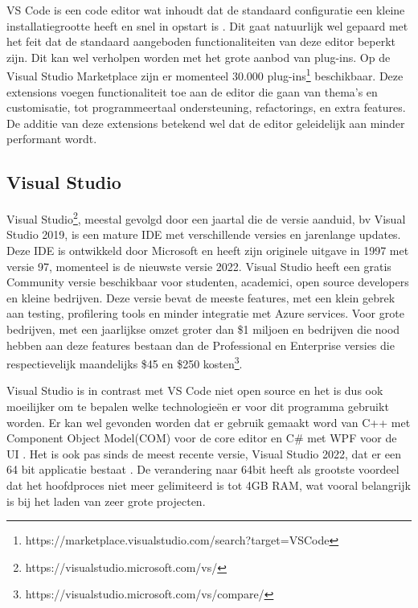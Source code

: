 VS Code is een code editor wat inhoudt dat de standaard configuratie een kleine installatiegrootte heeft en snel in opstart is \autocite{Johnson2019}. Dit gaat natuurlijk wel gepaard met het feit dat de standaard aangeboden functionaliteiten van deze editor beperkt zijn. Dit kan wel verholpen worden met het grote aanbod van plug-ins. Op de Visual Studio Marketplace zijn er momenteel 30.000 plug-ins\footnote{https://marketplace.visualstudio.com/search?target=VSCode} beschikbaar. Deze extensions voegen functionaliteit toe aan de editor die gaan van thema's en customisatie, tot programmeertaal ondersteuning, refactorings, en extra features. De additie van deze extensions betekend wel dat de editor geleidelijk aan minder performant wordt.

\subsection{Visual Studio } 

Visual Studio\footnote{https://visualstudio.microsoft.com/vs/}, meestal gevolgd door een jaartal die de versie aanduid, bv Visual Studio 2019, is een mature IDE met verschillende versies en jarenlange updates. Deze IDE is ontwikkeld door Microsoft en heeft zijn originele uitgave in 1997 met versie 97, momenteel is de nieuwste versie 2022. Visual Studio heeft een gratis Community versie beschikbaar voor studenten, academici, open source developers en kleine bedrijven. Deze versie bevat de meeste features, met een klein gebrek aan testing, profilering tools en minder integratie met Azure services. Voor grote bedrijven, met een jaarlijkse omzet groter dan \$1 miljoen en bedrijven die nood hebben aan deze features bestaan dan de Professional en Enterprise versies die respectievelijk maandelijks \$45 en \$250 kosten\footnote{https://visualstudio.microsoft.com/vs/compare/}.

Visual Studio is in contrast met VS Code niet open source en het is dus ook moeilijker om te bepalen welke technologieën er voor dit programma gebruikt worden. Er kan wel gevonden worden dat er gebruik gemaakt word van C++ met Component Object Model(COM) voor de core editor en C\# met WPF voor de UI \autocite{Dirmid2018}. Het is ook pas sinds de meest recente versie, Visual Studio 2022, dat er een 64 bit applicatie bestaat \autocite{Silver2021}. De verandering naar 64bit heeft als grootste voordeel dat het hoofdproces niet meer gelimiteerd is tot 4GB RAM, wat vooral belangrijk is bij het laden van zeer grote projecten.

